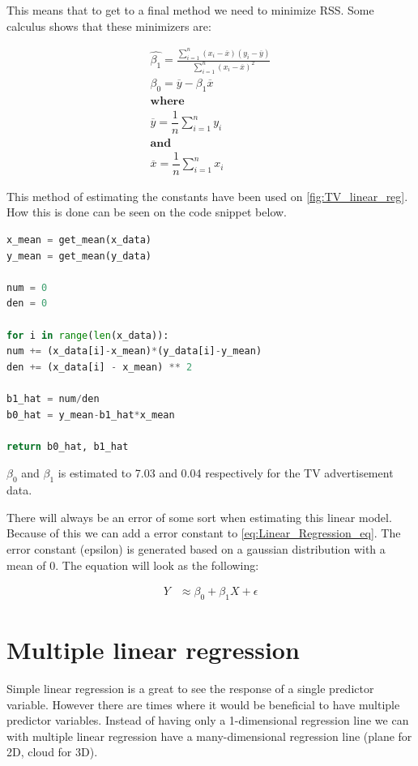 This means that to get to a final method we need to minimize RSS. Some calculus shows that these minimizers are:

\begin{equation} \label{eq:RSS_e}
\begin{split}
\hat{\beta_1}=\frac{\sum_{i=1}^{n}(x_{i}-\overline{x})(y_{i}-\overline{y})}{\sum_{i=1}^{n}(x_{i}-\overline{x})^{2}} \\
\beta_0=\overline{y}-\beta_1\overline{x} \\
\textbf{where} \\
\overline{y}=\dfrac{1}{n}\sum_{i=1}^{n}y_{i} \\
\textbf{and} \\
\overline{x}=\dfrac{1}{n}\sum_{i=1}^{n}x_{i} 
\end{split}
\end{equation} 

This method of estimating the constants have been used on \cref*{fig:TV_linear_reg}. How this is done can be seen on the code snippet below.

\begin{lstlisting}[language=Python]
x_mean = get_mean(x_data)
y_mean = get_mean(y_data)

num = 0
den = 0

for i in range(len(x_data)):
num += (x_data[i]-x_mean)*(y_data[i]-y_mean)
den += (x_data[i] - x_mean) ** 2

b1_hat = num/den
b0_hat = y_mean-b1_hat*x_mean

return b0_hat, b1_hat
\end{lstlisting}

$\beta_0$ and $\beta_1$ is estimated to 7.03 and 0.04 respectively for the TV advertisement data.

There will always be an error of some sort when estimating this linear model. Because of this we can add a error constant to \cref{eq:Linear_Regression_eq}. The error constant (epsilon) is generated based on a gaussian distribution with a mean of 0. The equation will look as the following:

\begin{equation} \label{eq:linear_reg_e}
\begin{split}
Y & \approx \beta_0 + \beta_1 X + \epsilon
\end{split}
\end{equation} 

\section{Multiple linear regression}
Simple linear regression is a great to see the response of a single predictor variable. However there are times where it would be beneficial to have multiple predictor variables. Instead of having only a 1-dimensional regression line we can with multiple linear regression have a many-dimensional regression line (plane for 2D, cloud for 3D).

